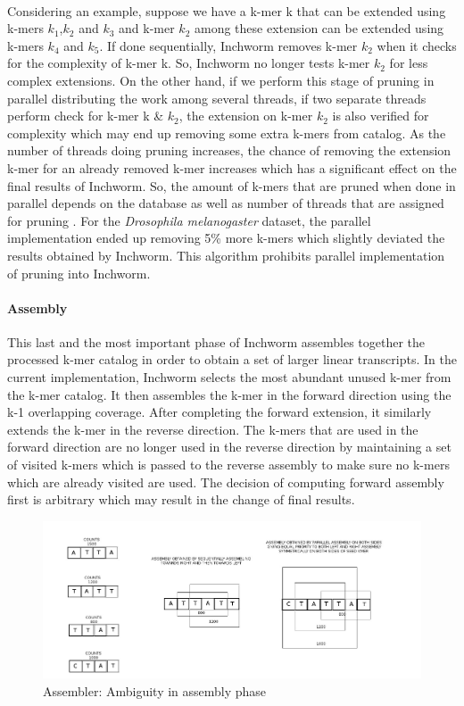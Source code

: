 \label{key}\documentclass[bachinf, english ,zihtitle,final,hyperref,utf8]{zihpub}
\begin{document}
\paragraph{}Considering an example, suppose we have a k-mer k that can be extended using k-mers {$k_{1}$,$k_{2}$ and $k_{3}$} and k-mer $k_{2}$ among these extension can be extended using k-mers {$k_{4}$ and $k_{5}$}. If done sequentially, Inchworm removes k-mer $k_{2}$ when it checks for the complexity of k-mer k. So, Inchworm no longer tests k-mer $k_{2}$ for less complex extensions. On the other hand, if we perform this stage of pruning in parallel distributing the work among several threads, if two separate threads perform check for k-mer k \& $k_{2}$, the extension on k-mer $k_{2}$ is also verified for complexity which may end up removing some extra k-mers from catalog. As the number of threads doing pruning increases, the chance of removing the extension k-mer for an already removed k-mer increases which has a significant effect on the final results of Inchworm. So, the amount of k-mers that are pruned when done in parallel depends on the database as well as number of threads that are assigned for pruning . For the  \emph{Drosophila melanogaster} dataset, the parallel implementation ended up removing 5\% more k-mers which slightly deviated the results obtained by Inchworm. This algorithm prohibits parallel implementation of pruning into Inchworm.
\paragraph{Assembly}
This last and the most important phase of Inchworm assembles together the processed k-mer catalog in order to obtain a set of larger linear transcripts. In the current implementation, Inchworm selects the most abundant unused k-mer from the k-mer catalog. It then assembles the k-mer in the forward direction using the k-1 overlapping coverage. After completing the forward extension, it similarly extends the k-mer in the reverse direction. The k-mers that are used in the forward direction are no longer used in the reverse direction by maintaining a set of visited k-mers which is passed to the reverse assembly to make sure no k-mers which are already visited are used. The decision of computing forward assembly first is arbitrary which may result in the change of final results.
\begin{figure}[h]
\center
\includegraphics[scale=0.5]{assemble}
\caption{Assembler: Ambiguity in assembly phase}
\label{ambiguity}
\end{figure}
\end{document}
